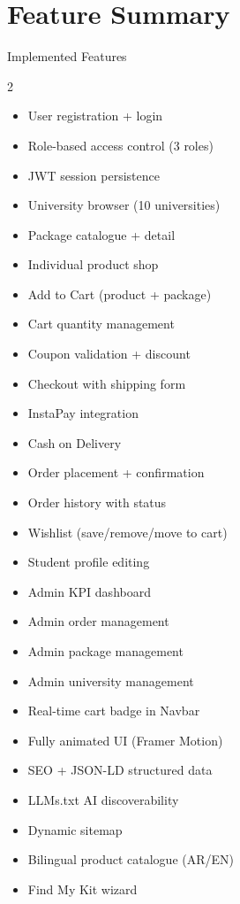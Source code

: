\documentclass[12pt, a4paper]{article}
\begin{document}
\section{Feature Summary}

\begin{bluebox}{Implemented Features}
\begin{multicols}{2}
\begin{itemize}[noitemsep, leftmargin=*]
  \item[\checkmark] User registration + login
  \item[\checkmark] Role-based access control (3 roles)
  \item[\checkmark] JWT session persistence
  \item[\checkmark] University browser (10 universities)
  \item[\checkmark] Package catalogue + detail
  \item[\checkmark] Individual product shop
  \item[\checkmark] Add to Cart (product + package)
  \item[\checkmark] Cart quantity management
  \item[\checkmark] Coupon validation + discount
  \item[\checkmark] Checkout with shipping form
  \item[\checkmark] InstaPay integration
  \item[\checkmark] Cash on Delivery
  \item[\checkmark] Order placement + confirmation
  \item[\checkmark] Order history with status
  \item[\checkmark] Wishlist (save/remove/move to cart)
  \item[\checkmark] Student profile editing
  \item[\checkmark] Admin KPI dashboard
  \item[\checkmark] Admin order management
  \item[\checkmark] Admin package management
  \item[\checkmark] Admin university management
  \item[\checkmark] Real-time cart badge in Navbar
  \item[\checkmark] Fully animated UI (Framer Motion)
  \item[\checkmark] SEO + JSON-LD structured data
  \item[\checkmark] LLMs.txt AI discoverability
  \item[\checkmark] Dynamic sitemap
  \item[\checkmark] Bilingual product catalogue (AR/EN)
  \item[\checkmark] Find My Kit wizard
\end{itemize}
\end{multicols}
\end{bluebox}
\end{document}
